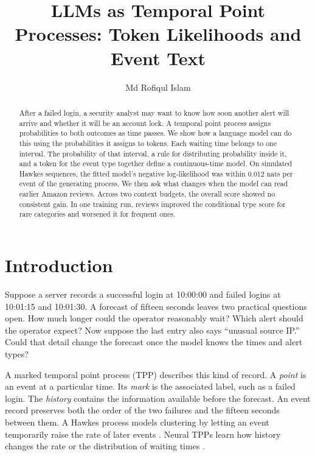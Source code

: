 \documentclass[sigconf,nonacm]{acmart}
\begin{document}
\title{LLMs as Temporal Point Processes: Token Likelihoods and Event Text}
\author{Md Rofiqul Islam}
\begin{abstract}
After a failed login, a security analyst may want to know how soon another alert will arrive and whether it will be an account lock. A temporal point process assigns probabilities to both outcomes as time passes. We show how a language model can do this using the probabilities it assigns to tokens. Each waiting time belongs to one interval. The probability of that interval, a rule for distributing probability inside it, and a token for the event type together define a continuous-time model. On simulated Hawkes sequences, the fitted model's negative log-likelihood was within 0.012 nats per event of the generating process. We then ask what changes when the model can read earlier Amazon reviews. Across two context budgets, the overall score showed no consistent gain. In one training run, reviews improved the conditional type score for rare categories and worsened it for frequent ones.
\end{abstract}
\maketitle
\section{Introduction}
Suppose a server records a successful login at 10:00:00 and failed logins at 10:01:15 and 10:01:30. A forecast of fifteen seconds leaves two practical questions open. How much longer could the operator reasonably wait? Which alert should the operator expect? Now suppose the last entry also says ``unusual source IP.'' Could that detail change the forecast once the model knows the times and alert types?

A marked temporal point process (TPP) describes this kind of record. A \emph{point} is an event at a particular time. Its \emph{mark} is the associated label, such as a failed login. The \emph{history} contains the information available before the forecast. An event record preserves both the order of the two failures and the fifteen seconds between them. A Hawkes process models clustering by letting an event temporarily raise the rate of later events \cite{hawkes1971}. Neural TPPs learn how history changes the rate or the distribution of waiting times \cite{shchur2020intensityfree,shchur2021review,zhou2026survey}.
\end{document}
